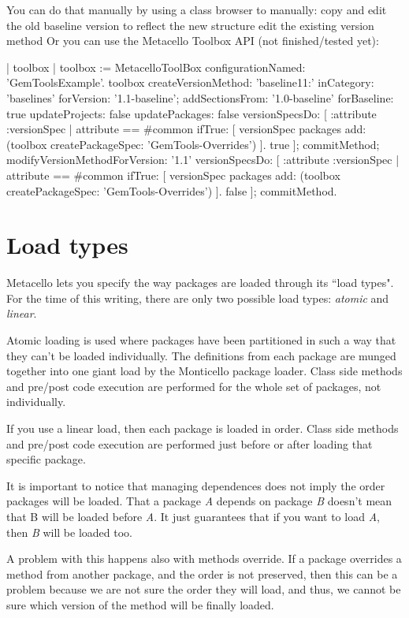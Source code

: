 \documentclass[a4paper,10pt,twoside]{book}
\begin{document}
You can do that manually by using a class browser to manually:
copy and edit the old baseline version to reflect the new structure
edit the existing  version method
Or you can use the Metacello Toolbox API (not finished/tested yet):

\begin{code}{}
| toolbox |
toolbox := MetacelloToolBox configurationNamed: 'GemToolsExample'.
toolbox
  createVersionMethod: 'baseline11:' inCategory: 'baselines' forVersion: '1.1-baseline';
  addSectionsFrom: '1.0-baseline'
     forBaseline: true
     updateProjects: false
     updatePackages: false
     versionSpecsDo: [ :attribute :versionSpec |
        attribute == #common
          ifTrue: [ versionSpec packages add: (toolbox createPackageSpec: 'GemTools-Overrides') ].
        true ];
  commitMethod;
  modifyVersionMethodForVersion: '1.1'
     versionSpecsDo: [ :attribute :versionSpec |
        attribute == #common
          ifTrue: [ versionSpec packages add: (toolbox createPackageSpec: 'GemTools-Overrides') ].
        false ];
  commitMethod.
\end{code}


\section{Load types}
Metacello lets you specify the way packages are loaded through its ``load types". For the time of this writing, there are only two possible load types: \emph{atomic} and \emph{linear}. 

Atomic loading is used where packages have been partitioned in such a way that they can't be loaded individually. The definitions from each package are munged together into one giant load by the Monticello package loader. Class side  methods and pre/post code execution are performed for the whole set of packages, not individually. 

If you use a linear load, then each package is loaded in order. Class side  methods and pre/post code execution are performed just before or after loading that specific package.

It is important to notice that managing dependences does not imply the order packages will be loaded. That a package \emph{A} depends on package \emph{B} doesn't mean that B will be loaded before \emph{A}. It just guarantees that if you want to load \emph{A}, then \emph{B} will be loaded too. 

A problem with this happens also with methods override. If a package overrides a method from another package, and the order is not preserved, then this can be a problem because we are not sure the order they will load, and thus, we cannot be sure which version of the method will be finally loaded. 
\end{document}

